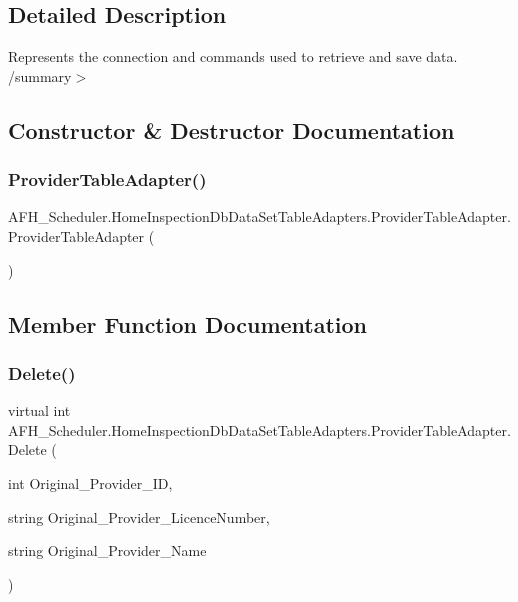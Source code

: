 \subsection{Detailed Description}
Represents the connection and commands used to retrieve and save data. /summary$>$ 

\subsection{Constructor \& Destructor Documentation}
\mbox{\label{class_a_f_h___scheduler_1_1_home_inspection_db_data_set_table_adapters_1_1_provider_table_adapter_a9121a04e863d065c19593ef648c0c35e}} 
\subsubsection{ProviderTableAdapter()}
{\footnotesize\ttfamily A\+F\+H\+\_\+\+Scheduler.\+Home\+Inspection\+Db\+Data\+Set\+Table\+Adapters.\+Provider\+Table\+Adapter.\+Provider\+Table\+Adapter (\begin{DoxyParamCaption}{ }\end{DoxyParamCaption})}



\subsection{Member Function Documentation}
\mbox{\label{class_a_f_h___scheduler_1_1_home_inspection_db_data_set_table_adapters_1_1_provider_table_adapter_a67fad2cbb5082aa8c17151609dd0f19a}} 
\subsubsection{Delete()}
{\footnotesize\ttfamily virtual int A\+F\+H\+\_\+\+Scheduler.\+Home\+Inspection\+Db\+Data\+Set\+Table\+Adapters.\+Provider\+Table\+Adapter.\+Delete (\begin{DoxyParamCaption}\item[{int}]{Original\+\_\+\+Provider\+\_\+\+ID,  }\item[{string}]{Original\+\_\+\+Provider\+\_\+\+Licence\+Number,  }\item[{string}]{Original\+\_\+\+Provider\+\_\+\+Name }\end{DoxyParamCaption})\hspace{0.3cm}{\ttfamily [virtual]}}

